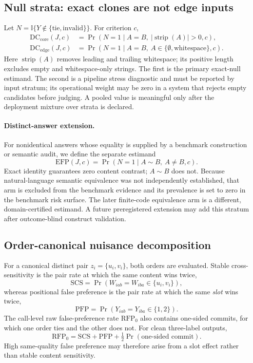 \documentclass[10pt]{article}
\newcommand{\DCcore}{\ensuremath{\mathrm{DC}_{\mathrm{core}}}}
\newcommand{\DCedge}{\ensuremath{\mathrm{DC}_{\mathrm{edge}}}}
\newcommand{\EFP}{\ensuremath{\mathrm{EFP}}}
\newcommand{\RFP}{\ensuremath{\mathrm{RFP}_{0}}}
\newcommand{\SCS}{\ensuremath{\mathrm{SCS}}}
\newcommand{\PFP}{\ensuremath{\mathrm{PFP}}}
\newcommand{\ind}{\mathbb{I}}
\begin{document}
\subsection{Null strata: exact clones are not edge inputs}

Let $N=\ind\{Y\notin\{\mathrm{tie},\mathrm{invalid}\}\}$. For criterion $c$,
\begin{align}
\DCcore(J,c) &= \Pr(N=1\mid A=B,\ |\operatorname{strip}(A)|>0,c),\\
\DCedge(J,c) &= \Pr(N=1\mid A=B,\ A\in\{\emptyset,\mathrm{whitespace}\},c).
\end{align}
Here $\operatorname{strip}(A)$ removes leading and trailing whitespace; its positive length excludes empty and whitespace-only strings. The first is the primary exact-null estimand. The second is a pipeline stress diagnostic and must be reported by input stratum; its operational weight may be zero in a system that rejects empty candidates before judging. A pooled value is meaningful only after the deployment mixture over strata is declared.

\paragraph{Distinct-answer extension.}
For nonidentical answers whose equality is supplied by a benchmark construction or semantic audit, we define the separate estimand
\[
\EFP(J,c)=\Pr(N=1\mid A\sim B,\ A\neq B,c).
\]
Exact identity guarantees zero content contrast; $A\sim B$ does not. Because natural-language semantic equivalence was not independently established, that arm is excluded from the benchmark evidence and its prevalence is set to zero in the benchmark risk surface. The later finite-code equivalence arm is a different, domain-certified estimand. A future preregistered extension may add this stratum after outcome-blind construct validation.

\subsection{Order-canonical nuisance decomposition}

For a canonical distinct pair $z_i=\{u_i,v_i\}$, both orders are evaluated. Stable cross-sensitivity is the pair rate at which the same content wins twice,
\[
\SCS=\Pr(W_{iab}=W_{iba}\in\{u_i,v_i\}),
\]
whereas positional false preference is the pair rate at which the same \emph{slot} wins twice,
\[
\PFP=\Pr(Y_{iab}=Y_{iba}\in\{1,2\}).
\]
The call-level raw false-preference rate $\RFP$ also contains one-sided commits, for which one order ties and the other does not. For clean three-label outputs,
\[
\RFP=\SCS+\PFP+\tfrac{1}{2}\Pr(\text{one-sided commit}).
\]
High same-quality false preference may therefore arise from a slot effect rather than stable content sensitivity.
\end{document}
